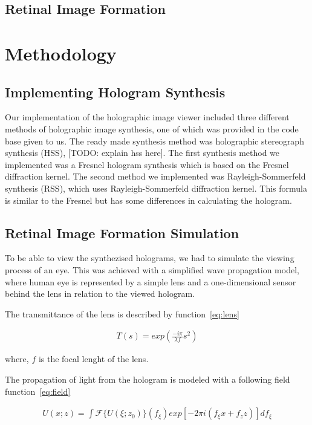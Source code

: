 \documentclass[12pt,a4paper,english
]{tunithesis}
\begin{document}
\section{Retinal Image Formation}

\chapter{Methodology}
\label{sec:methodology}

\section{Implementing Hologram Synthesis}
Our implementation of the holographic image viewer included three different methods of holographic image synthesis, one of which was provided in the code base given to us. The ready made synthesis method was holographic stereograph synthesis (HSS), [TODO: explain hss here]. The first synthesis method we implemented was a Fresnel hologram synthesis which is based on the Fresnel diffraction kernel. The second method we implemented was Rayleigh-Sommerfeld synthesis (RSS), which uses Rayleigh-Sommerfeld diffraction kernel. This formula is similar to the Fresnel but has some differences in calculating the hologram.

\section{Retinal Image Formation Simulation}
To be able to view the synthezised holograms, we had to simulate the viewing process of an eye. This was achieved with a simplified wave propagation model, where human eye is represented by a simple lens and a one-dimensional sensor behind the lens in relation to the viewed hologram.

The transmittance of the lens is described by function~\ref{eq:lens}

\begin{align}
  \label{eq:lens}
  T(s) = exp(\frac{-i\pi}{\lambda f}s^2)
\end{align}

where, $f$ is the focal lenght of the lens.

The propagation of light from the hologram is modeled with a following field function~\ref{eq:field}

\begin{align}
  \label{eq:field}
  U(x;z) = \int \mathscr{F} \{U (\xi;z_0) \} (f_\xi) exp[-2 \pi i (f_\xi x + f_z z)] d f_\xi
\end{align}
\end{document}
